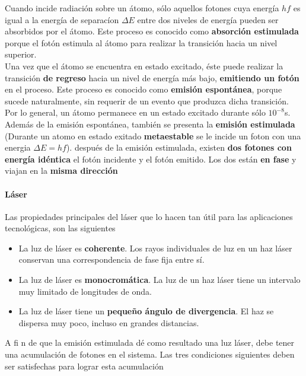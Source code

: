 \documentclass[10pt]{article}
\begin{document}
Cuando incide radiación sobre un átomo, sólo aquellos fotones cuya energía $hf$ es igual a la energía de separacíon $\Delta E$ entre dos niveles de energía pueden ser absorbidos por el átomo. Este proceso es conocido como \textbf{absorción estimulada} porque el fotón estimula al átomo para realizar la transición hacia un nivel superior.\\
\linebreak
Una vez que el átomo se encuentra en estado excitado, éste puede realizar la transición \textbf{de regreso} hacia un nivel de energía más bajo, \textbf{emitiendo un fotón} en el proceso. Este proceso es conocido como \textbf{emisión espontánea}, porque
sucede naturalmente, sin requerir de un evento que produzca dicha transición. Por lo general, un átomo permanece en un estado excitado durante sólo $10^{-8}$s.\\
\linebreak
Además de la emisión espontánea, también se presenta la \textbf{emisión estimulada} (Durante un atomo en estado exitado \textbf{metaestable} se le incide un foton con una energia  $\Delta E = hf$). después de la emisión estimulada, existen \textbf{dos fotones con energía idéntica} el fotón incidente y el fotón emitido. Los dos están \textbf{en fase} y viajan en la \textbf{misma dirección}

\paragraph{Láser}
Las propiedades principales del láser que lo hacen tan útil para las aplicaciones tecnológicas, son las siguientes
\begin{itemize}
	\item La luz de láser es \textbf{coherente}. Los rayos individuales de luz en un haz láser conservan una correspondencia de fase fija entre sí.
 	\item La luz de láser es \textbf{monocromática}. La luz de un haz láser tiene un intervalo muy limitado de longitudes de onda.
	\item La luz de láser tiene un \textbf{pequeño ángulo de divergencia}. El haz se dispersa muy poco, incluso en grandes distancias.
\end{itemize}

A fi n de que la emisión estimulada dé como resultado una luz láser, debe tener una acumulación de fotones en el sistema. Las tres condiciones siguientes deben ser satisfechas para lograr esta acumulación
\end{document}
